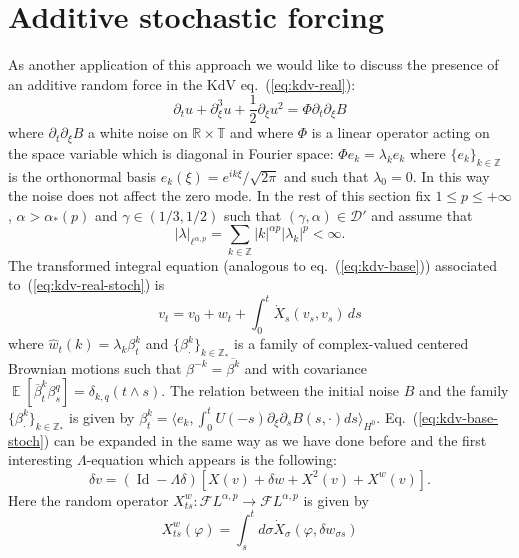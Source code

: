 \documentclass[a4paper,11pt,reqno]{article}
\DeclareMathOperator{\expect}{{\mathbb E}}
\newcommand{\der}{\delta}
\newcommand{\RR}{\mathbb{R}}
\newcommand{\TT}{\mathbb{T}}
\newcommand{\DD}{\mathcal{D}}
\newcommand{\FF}{\mathcal{F}}
\newcommand{\ZZ}{\mathbb{Z}}
\newcommand{\wh}{\widehat}
\DeclareMathOperator{\id}{\text{Id}}
\begin{document}
\section{Additive stochastic forcing}
\label{sec:stoch}
As another application of this approach we would like to discuss the presence of an additive random force in the KdV eq.~(\ref{eq:kdv-real}):
\begin{equation}
  \label{eq:kdv-real-stoch}
\partial_t u + \partial^3_\xi u +
\frac12 \partial_\xi u^2 = \Phi \partial_t  \partial_\xi B
\end{equation}
where 
$\partial_t \partial_\xi B$ a white noise on $\RR\times\TT$ and where
$\Phi$ is a linear operator acting on the space variable which is diagonal in Fourier space: $\Phi e_k =
\lambda_k e_k$ where $\{e_k \}_{k\in\ZZ}$ is the orthonormal basis
$e_k(\xi) = e^{ik\xi}/\sqrt{2\pi}$ and such that $\lambda_0 = 0$.  In this
way the noise does not affect the zero mode.
In the rest of this section  fix $1\le p \le +\infty$, $\alpha > \alpha_*(p)$ and $\gamma\in (1/3,1/2)$ such that $(\gamma,\alpha)
\in \DD'$ and assume that
\begin{equation}
  \label{eq:lambda-bound}
|\lambda|_{\ell^{\alpha,p}} = \sum_{k \in \ZZ}  |k|^{\alpha p} |\lambda_k|^p < \infty .
\end{equation}
The transformed integral equation (analogous to
eq.~(\ref{eq:kdv-base})) associated to~(\ref{eq:kdv-real-stoch}) is
\begin{equation}
  \label{eq:kdv-base-stoch}
 v_t =   v_0 + w_t +  \int_0^t \dot X_s(
  v_s, v_s) \, ds
\end{equation}
where $\wh w_t(k) = \lambda_k \beta^k_t$ and $\{\beta^k_\cdot\}_{k \in \ZZ_*}$ is a family of 
complex-valued centered Brownian motions such that $\beta^{-k} =
\overline{\beta^k}$ and with covariance
$\expect[\overline \beta^k_t \beta^q_s] = \delta_{k,q} (t\wedge s)$. 
The relation between the initial noise $B$ and the family $\{\beta^k_\cdot\}_{k \in \ZZ_*}$ is given by 
$
\beta^k_t = \langle e_k, \int_0^t U(-s) \partial_\xi \partial_s B(s,\cdot) ds \rangle_{H^0} 
$.
Eq.~(\ref{eq:kdv-base-stoch}) can be expanded in the same
way as we have done before and the first
interesting $\Lambda$-equation which appears is the following:
\begin{equation}
  \label{eq:lambda-eq-stoch}
  \der v = (\id-\Lambda\der)[X(v) + \der w + X^{2}(v) + X^{w}(v)].
\end{equation}
Here   the
random operator $X^w_{ts}: \FF L^{\alpha,p}\to \FF L^{\alpha,p}$ is given by
\begin{equation}
  \label{eq:Xw}
  X^w_{ts}(\varphi) = \int_s^t d\sigma \dot X_\sigma(\varphi, \der
  w_{\sigma s})
\end{equation}
\end{document}

